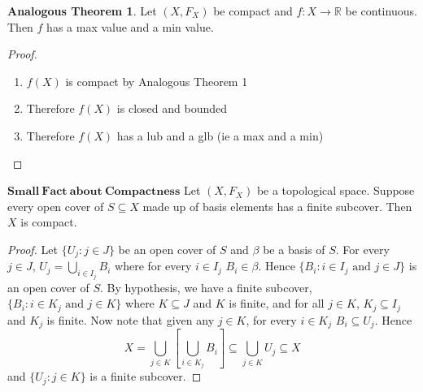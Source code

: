 \documentclass[10pt,reqno]{amsart}
\newcommand{\R}{\mathbb{R}}
\newtheorem*{Small Fact}{Small Fact}
\newtheorem*{Small Fact about Basis}{Small Fact about Basis}
\newtheorem*{Tiny Fact about Projection Maps}{Tiny Fact about Projection Maps}
\theoremstyle{definition}
\newtheorem{Analogous Theorem}{Analogous Theorem}
\begin{document}
\begin{Analogous Theorem}
Let $(X, F_X)$ be compact and $f : X \rightarrow \R$ be continuous. Then $f$ has a max value and a min value. 
\end{Analogous Theorem}
\begin{proof}
\begin{enumerate}
\item $f(X)$ is compact by Analogous Theorem 1
\item Therefore $f(X)$ is closed and bounded
\item Therefore $f(X)$ has a lub and a glb (ie a max and a min)
\end{enumerate}
\end{proof}
$\mathbf{Small \ Fact \ about \ Compactness}$
Let $(X, F_X)$ be a topological space. Suppose every open cover of $S \subseteq X$ made up of basis elements has a finite subcover. Then $X$ is compact. 
\begin{proof}
Let $\{U_j : j \in J\}$ be an open cover of $S$ and $\beta$ be a basis of $S$. For every $j \in J$, $U_j = \bigcup_{i \in I_j}B_i$ where for every $i \in I_j$ $B_i \in \beta$. Hence $\{B_i : i \in I_j \text{ and } j \in J\}$ is an open cover of $S$. By hypothesis, we have a finite subcover, $\{B_i : i \in K_j \text{ and } j \in K\}$ where $K \subseteq J$ and $K$ is finite, and for all $j \in K$, $K_j \subseteq I_j$ and $K_j$ is finite. Now note that given any $j \in K$, for every $i \in K_j$ $B_i \subseteq U_j$.  Hence $$X = \bigcup_{j\in K} \left[ \bigcup_{i \in K_j} B_i \right] \subseteq \bigcup_{j\in K} U_j \subseteq X$$ and $\{U_j : j\in K\}$ is a finite subcover. 
\end{proof}
\end{document}
